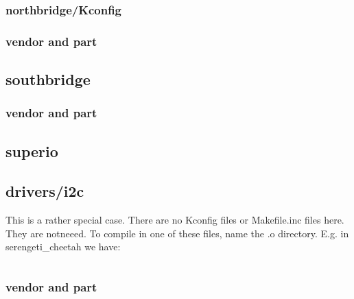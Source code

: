 \documentclass[10pt,letterpaper]{article}
\begin{document}
\subsubsection{northbridge/Kconfig}




\subsubsection{vendor and part}
\subsection{southbridge}
\subsubsection{vendor and part}
\subsection{superio}
\subsection{drivers/i2c}
This is a rather special case. There are no Kconfig files or Makefile.inc files here. They are notneeed. 
To compile in one of these files, name the .o directory. E.g. in serengeti_cheetah we have: 
\begin{verbatim}
\end{verbatim}

\subsubsection{vendor and part}
\end{document}
